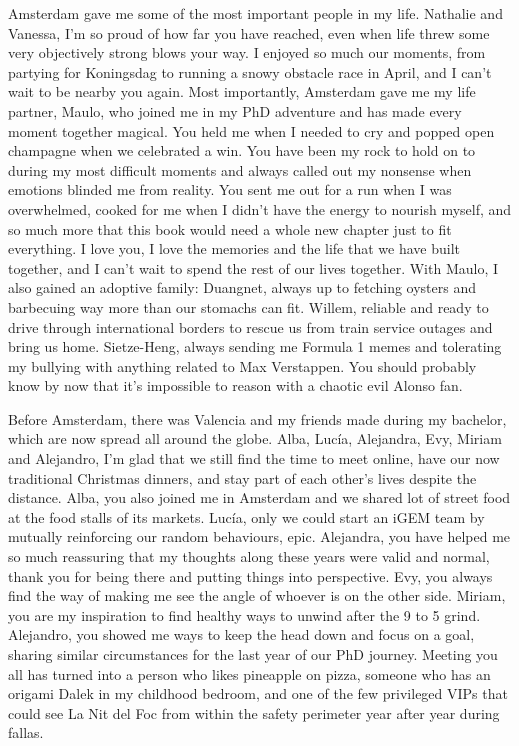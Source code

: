 Amsterdam gave me some of the most important people in my life. Nathalie and Vanessa, I'm so proud of how far you have reached, even when life threw some very objectively strong blows your way. I enjoyed so much our moments, from partying for Koningsdag to running a snowy obstacle race in April, and I can't wait to be nearby you again. Most importantly, Amsterdam gave me my life partner, Maulo, who joined me in my PhD adventure and has made every moment together magical. You held me when I needed to cry and popped open champagne when we celebrated a win. You have been my rock to hold on to during my most difficult moments and always called out my nonsense when emotions blinded me from reality. You sent me out for a run when I was overwhelmed, cooked for me when I didn't have the energy to nourish myself, and so much more that this book would need a whole new chapter just to fit everything. I love you, I love the memories and the life that we have built together, and I can't wait to spend the rest of our lives together. With Maulo, I also gained an adoptive family: Duangnet, always up to fetching oysters and barbecuing way more than our stomachs can fit. Willem, reliable and ready to drive through international borders to rescue us from train service outages and bring us home. Sietze-Heng, always sending me Formula 1 memes and tolerating my bullying with anything related to Max Verstappen. You should probably know by now that it's impossible to reason with a chaotic evil Alonso fan.

Before Amsterdam, there was Valencia and my friends made during my bachelor, which are now spread all around the globe. Alba, Lucía, Alejandra, Evy, Miriam and Alejandro, I'm glad that we still find the time to meet online, have our now traditional Christmas dinners, and stay part of each other's lives despite the distance. Alba, you also joined me in Amsterdam and we shared lot of street food at the food stalls of its markets. Lucía, only we could start an iGEM team by mutually reinforcing our random behaviours, epic. Alejandra, you have helped me so much reassuring that my thoughts along these years were valid and normal, thank you for being there and putting things into perspective. Evy, you always find the way of making me see the angle of whoever is on the other side. Miriam, you are my inspiration to find healthy ways to unwind after the 9 to 5 grind. Alejandro, you showed me ways to keep the head down and focus on a goal, sharing similar circumstances for the last year of our PhD journey. Meeting you all has turned into a person who likes pineapple on pizza, someone who has an origami Dalek in my childhood bedroom, and one of the few privileged VIPs that could see La Nit del Foc from within the safety perimeter year after year during fallas.

